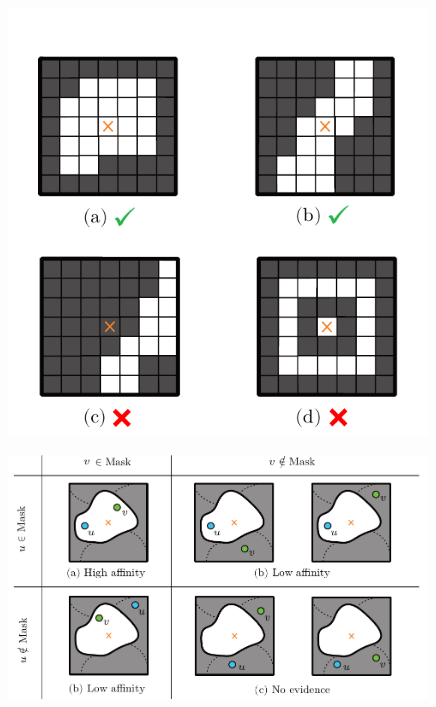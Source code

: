 \begin{figure}[t]
\centering
\begin{minipage}[t]{0.36\textwidth}
        \centering
        \includegraphics[width=0.99\textwidth]{./figures/LSIMasks/valid_masks.pdf} %
    \label{fig:valid_masks}
\end{minipage}\hfill
\begin{minipage}[t]{0.58\textwidth}
\centering
\includegraphics[width=0.99\textwidth]{./figures/LSIMasks/mask_cases_new.pdf} %

\end{minipage}
\end{figure}
